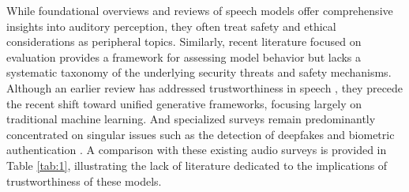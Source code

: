 While foundational overviews and reviews of speech models \cite{latif2023sparks, peng2025survey, su2025audio} offer comprehensive insights into auditory perception, they often treat safety and ethical considerations as peripheral topics. Similarly, recent literature focused on evaluation provides a framework  \cite{yang2025towards} for assessing model behavior but lacks a systematic taxonomy of the underlying security threats and safety mechanisms. Although an earlier review has addressed trustworthiness in speech \cite{feng2022review}, they precede the recent shift toward unified generative frameworks, focusing largely on traditional machine learning. And specialized surveys remain predominantly concentrated on singular issues such as the detection of deepfakes and biometric authentication \cite{yi2023audio, li2025survey, pham2025comprehensive}. A comparison with these existing audio surveys is provided in Table \ref{tab:1}, illustrating the lack of literature dedicated to the implications of trustworthiness of these models.








